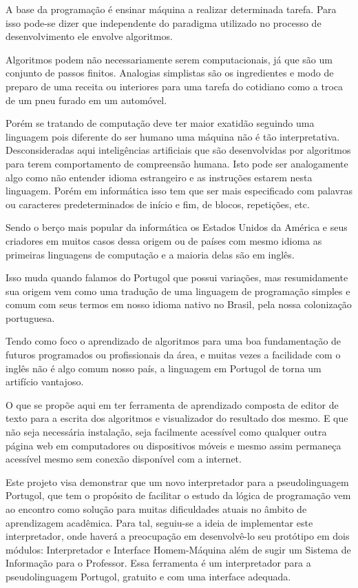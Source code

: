 
A base da programação é ensinar máquina a realizar determinada tarefa. Para isso
pode-se dizer que independente do paradigma utilizado no processo de
desenvolvimento ele envolve algoritmos.

Algoritmos podem não necessariamente serem computacionais, já que são um
conjunto de passos finitos. Analogias simplistas são os ingredientes e modo de
preparo de uma receita ou interiores para uma tarefa do cotidiano como a troca
de um pneu furado em um automóvel.

Porém se tratando de computação deve ter maior exatidão seguindo uma linguagem
pois diferente do ser humano uma máquina não é tão interpretativa.
Desconsideradas aqui inteligências artificiais que são desenvolvidas por
algoritmos para terem  comportamento de compreensão humana. Isto pode ser
analogamente algo como não entender idioma estrangeiro e as instruções estarem
nesta linguagem. Porém em informática isso tem que ser mais especificado com
palavras ou caracteres predeterminados de início e fim, de blocos, repetições,
etc.

Sendo o berço mais popular da informática os Estados Unidos da América e seus
criadores em muitos casos dessa origem ou de países com mesmo idioma as
primeiras linguagens de computação e a maioria delas são em inglês.

Isso muda quando falamos do Portugol que possui variações, mas resumidamente
sua origem vem como uma tradução de uma linguagem de programação simples e comum
com seus termos em nosso idioma nativo no Brasil, pela nossa colonização
portuguesa.

Tendo como foco o aprendizado de algoritmos para uma boa fundamentação de
futuros programados ou profissionais da área, e muitas vezes a facilidade com
o inglês não é algo comum nosso país, a linguagem em Portugol de torna um
artifício vantajoso.

O que se propõe aqui em ter ferramenta de aprendizado composta de editor de
texto para a escrita dos algoritmos e visualizador do resultado dos mesmo.
E que não seja necessária instalação, seja facilmente acessível como qualquer
outra página web em computadores ou dispositivos móveis e mesmo assim permaneça
acessível mesmo sem conexão disponível com a internet.

Este projeto visa demonstrar que um novo interpretador para a pseudolinguagem
Portugol, que tem o propósito de facilitar o estudo da lógica de programação vem
ao encontro como solução para muitas dificuldades atuais no âmbito de
aprendizagem acadêmica. Para tal, seguiu-se a ideia de implementar este
interpretador, onde haverá a preocupação em desenvolvê-lo seu protótipo em dois
módulos: Interpretador e Interface Homem-Máquina além de sugir um Sistema de
Informação para o Professor. Essa ferramenta é um interpretador para a
pseudolinguagem Portugol, gratuito e com uma interface adequada.
